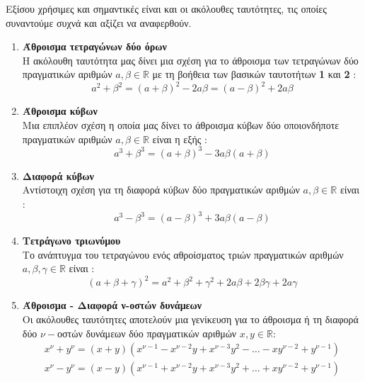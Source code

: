 Εξίσου χρήσιμες και σημαντικές είναι και οι ακόλουθες ταυτότητες, τις οποίες συναντούμε συχνά και αξίζει να αναφερθούν.
\begin{enumerate}[itemsep=0mm,label=\bf\arabic*.,start=8]
\item \textbf{Άθροισμα τετραγώνων δύο όρων}\\
Η ακόλουθη ταυτότητα μας δίνει μια σχέση για το άθροισμα των τετραγώνων δύο πραγματικών αριθμών $ a,\beta\in\mathbb{R} $ με τη βοήθεια των βασικών ταυτοτήτων \textbf{1} και \textbf{2} :
\[ a^2+\beta^2=(a+\beta)^2-2a\beta=(a-\beta)^2+2a\beta \]
\item \textbf{Άθροισμα κύβων}\\
Μια επιπλέον σχέση η οποία μας δίνει το άθροισμα κύβων δύο οποιονδήποτε πραγματικών αριθμών $ a,\beta\in\mathbb{R} $ είναι η εξής :
\[ a^3+\beta^3=(a+\beta)^3-3a\beta(a+\beta) \]
\item \textbf{Διαφορά κύβων}\\
Αντίστοιχη σχέση για τη διαφορά κύβων δύο πραγματικών αριθμών $ a,\beta\in\mathbb{R} $ είναι :
\[ a^3-\beta^3=(a-\beta)^3+3a\beta(a-\beta) \]
\item \textbf{Τετράγωνο τριωνύμου}\\
Το ανάπτυγμα του τετραγώνου ενός αθροίσματος τριών πραγματικών αριθμών $ a,\beta,\gamma\in\mathbb{R} $ είναι :
\[ (a+\beta+\gamma)^2=a^2+\beta^2+\gamma^2+2a\beta+2\beta\gamma+2a\gamma \]
\item \textbf{Άθροισμα - Διαφορά ν-οστών δυνάμεων}\\
Οι ακόλουθες ταυτότητες αποτελούν μια γενίκευση για το άθροισμα ή τη διαφορά δύο $ \nu- $οστών δυνάμεων δύο πραγματικών αριθμών $ x,y\in\mathbb{R} $:
\begin{gather*}
x^\nu+ y^\nu=(x+ y)\left(x^{\nu-1}- x^{\nu-2}y+x^{\nu-3}y^2-\ldots- xy^{\nu-2}+y^{\nu-1}\right)\\
x^\nu-y^\nu=(x-y)\left(x^{\nu-1}+ x^{\nu-2}y+x^{\nu-3}y^2+\ldots+ xy^{\nu-2}+y^{\nu-1}\right)
\end{gather*}
\end{enumerate}
\Lymena
